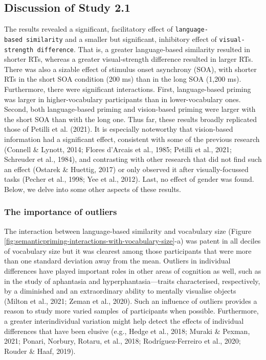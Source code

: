 \documentclass[
  12pt,
  man,floatsintext]{apa7}
\begin{document}
\hypertarget{discussion-of-study-2.1}{%
\subsection{Discussion of Study 2.1}\label{discussion-of-study-2.1}}

The results revealed a significant, facilitatory effect of \texttt{language-based\ similarity} and a smaller but significant, inhibitory effect of \texttt{visual-strength\ difference}. That is, a greater language-based similarity resulted in shorter RTs, whereas a greater visual-strength difference resulted in larger RTs. There was also a sizable effect of stimulus onset asynchrony (SOA), with shorter RTs in the short SOA condition (200 ms) than in the long SOA (1,200 ms). Furthermore, there were significant interactions. First, language-based priming was larger in higher-vocabulary participants than in lower-vocabulary ones. Second, both language-based priming and vision-based priming were larger with the short SOA than with the long one. Thus far, these results broadly replicated those of Petilli et al. (2021). It is especially noteworthy that vision-based information had a significant effect, consistent with some of the previous research (Connell \& Lynott, 2014; Flores d'Arcais et al., 1985; Petilli et al., 2021; Schreuder et al., 1984), and contrasting with other research that did not find such an effect (Ostarek \& Huettig, 2017) or only observed it after visually-focussed tasks (Pecher et al., 1998; Yee et al., 2012). Last, no effect of gender was found. Below, we delve into some other aspects of these results.

\hypertarget{the-importance-of-outliers}{%
\subsubsection{The importance of outliers}\label{the-importance-of-outliers}}

The interaction between language-based similarity and vocabulary size (Figure \ref{fig:semanticpriming-interactions-with-vocabulary-size}-a) was patent in all deciles of vocabulary size but it was clearest among those participants that were more than one standard deviation away from the mean. Outliers in individual differences have played important roles in other areas of cognition as well, such as in the study of aphantasia and hyperphantasia---traits characterised, respectively, by a diminished and an extraordinary ability to mentally visualise objects (Milton et al., 2021; Zeman et al., 2020). Such an influence of outliers provides a reason to study more varied samples~of participants when possible. Furthermore, a greater interindividual variation might help detect the effects of individual differences that have been elusive (e.g., Hedge et al., 2018; Muraki \& Pexman, 2021; Ponari, Norbury, Rotaru, et al., 2018; Rodríguez-Ferreiro et al., 2020; Rouder \& Haaf, 2019).
\end{document}
